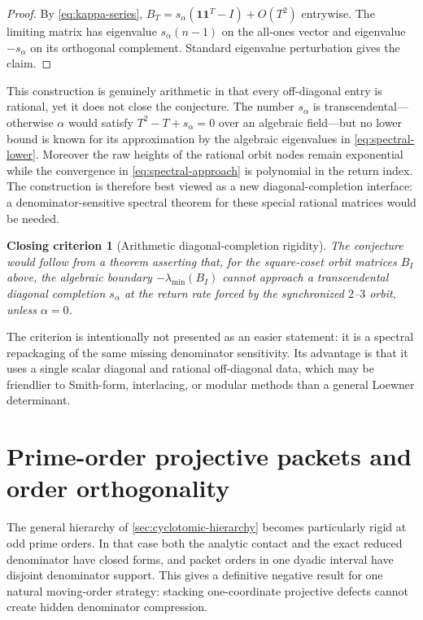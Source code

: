 \documentclass[11pt]{article}
\newtheorem{criterion}[theorem]{Closing criterion}
\theoremstyle{definition}
\theoremstyle{remark}
\begin{document}
\begin{proof}
By \eqref{eq:kappa-series}, $B_T=s_\alpha(\mathbf 1\mathbf 1^T-I)+O(T^2)$ entrywise.  The limiting matrix has eigenvalue $s_\alpha(n-1)$ on the all-ones vector and eigenvalue $-s_\alpha$ on its orthogonal complement.  Standard eigenvalue perturbation gives the claim.
\end{proof}

This construction is genuinely arithmetic in that every off-diagonal entry is rational, yet it does not close the conjecture.  The number $s_\alpha$ is transcendental---otherwise $\alpha$ would satisfy $T^2-T+s_\alpha=0$ over an algebraic field---but no lower bound is known for its approximation by the algebraic eigenvalues in \eqref{eq:spectral-lower}.  Moreover the raw heights of the rational orbit nodes remain exponential while the convergence in \eqref{eq:spectral-approach} is polynomial in the return index.  The construction is therefore best viewed as a new diagonal-completion interface: a denominator-sensitive spectral theorem for these special rational matrices would be needed.

\begin{criterion}[Arithmetic diagonal-completion rigidity]\label{crit:diag-completion}
The conjecture would follow from a theorem asserting that, for the square-coset orbit matrices $B_I$ above, the algebraic boundary $-\lambda_{\min}(B_I)$ cannot approach a transcendental diagonal completion $s_\alpha$ at the return rate forced by the synchronized $2$--$3$ orbit, unless $\alpha=0$.
\end{criterion}

The criterion is intentionally not presented as an easier statement: it is a spectral repackaging of the same missing denominator sensitivity.  Its advantage is that it uses a single scalar diagonal and rational off-diagonal data, which may be friendlier to Smith-form, interlacing, or modular methods than a general Loewner determinant.

\section{Prime-order projective packets and order orthogonality}
\label{sec:prime-order}

The general hierarchy of \cref{sec:cyclotomic-hierarchy} becomes particularly rigid at odd prime orders.  In that case both the analytic contact and the exact reduced denominator have closed forms, and packet orders in one dyadic interval have disjoint denominator support.  This gives a definitive negative result for one natural moving-order strategy: stacking one-coordinate projective defects cannot create hidden denominator compression.
\end{document}

